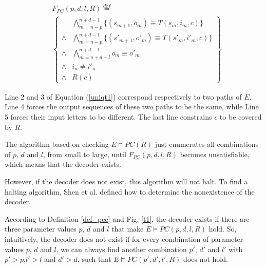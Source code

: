 \documentclass[journal]{IEEEtran}
\begin{document}
\begin{equation}\label{uniqt1}
\begin{split}
&F_{PC}(p,d,l,R)\stackrel{def}{=}\\
&\left\{
\begin{array}{cc}
&\bigwedge_{m=n-p}^{n+d-1}
\{
(s_{m+1},o_m)\equiv T(s_m,i_m,c)
\}
\\
\wedge&\bigwedge_{m=n-p}^{n+d-1}
\{
(s'_{m+1},o'_m)\equiv T(s'_m,i'_m,c)
\}
\\
\wedge&\bigwedge_{m=n+d-l}^{n+d-1}o_m\equiv o'_m \\
\wedge& i_n\ne i'_n \\
\wedge& R(c)
\end{array}
\right\}
\end{split}
\end{equation}


Line 2 and 3 of Equation (\ref{uniqt1}) correspond respectively to two paths of $E$.
Line 4 forces the output sequences of these two paths to be the same,
while Line 5 forces their input letters to be different.
The last line constrains $c$ to be covered by $R$.

The algorithm based on checking $E\vDash PC(R)$\cite{ShengYuShen:iccad09,ShengYuShen:tcad} just enumerates all combinations of $p$, $d$ and $l$,
from small to large,
until $F_{PC}(p,d,l,R)$ becomes unsatisfiable,
which means that the decoder exists.

However,
if the decoder does not exist,
this algorithm will not halt.
To find a halting algorithm,
Shen et al.\cite{ShengYuShen:tcad11} defined how to determine the nonexistence of the decoder.


According to Definition \ref{def_pcc} and Fig. \ref{t1},
the decoder exists if there are three parameter values $p$, $d$ and $l$ that make
$E\vDash PC(p,d,l,R)$ hold.
So,
intuitively,
the decoder does not exist if for every combination of parameter values $p$, $d$ and $l$,
we can always find another combination $p'$, $d'$ and $l'$ with $p'>p$,$l'>l$ and $d'>d$,
such that $E\vDash PC(p',d',l',R)$ does not hold.
\end{document}

